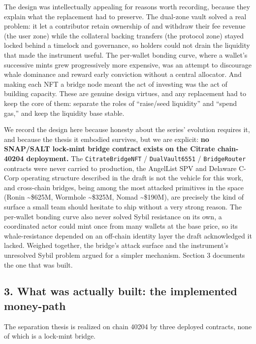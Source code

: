 The design was intellectually appealing for reasons worth recording,
because they explain what the replacement had to preserve. The dual-zone
vault solved a real problem: it let a contributor retain ownership of
and withdraw their fee revenue (the user zone) while the collateral
backing transfers (the protocol zone) stayed locked behind a timelock
and governance, so holders could not drain the liquidity that made the
instrument useful. The per-wallet bonding curve, where a wallet's
successive mints grew progressively more expensive, was an attempt to
discourage whale dominance and reward early conviction without a central
allocator. And making each NFT a bridge node meant the act of investing
was the act of building capacity. These are genuine design virtues, and
any replacement had to keep the core of them: separate the roles of
``raise/seed liquidity'' and ``spend gas,'' and keep the liquidity base
stable.

We record the design here because honesty about the series' evolution
requires it, and because the thesis it embodied survives, but we are
explicit: \textbf{no SNAP/SALT lock-mint bridge contract exists on the
Citrate chain-40204 deployment.} The \texttt{CitrateBridgeNFT} /
\texttt{DualVault6551} / \texttt{BridgeRouter} contracts were never
carried to production, the AngelList SPV and Delaware C-Corp operating
structure described in the draft is not the vehicle for this work, and
cross-chain bridges, being among the most attacked primitives in the
space (Ronin \textasciitilde\$625M, Wormhole \textasciitilde\$325M,
Nomad \textasciitilde\$190M), are precisely the kind of surface a small
team should hesitate to ship without a very strong reason. The
per-wallet bonding curve also never solved Sybil resistance on its own,
a coordinated actor could mint once from many wallets at the base price,
so its whale-resistance depended on an off-chain identity layer the
draft acknowledged it lacked. Weighed together, the bridge's attack
surface and the instrument's unresolved Sybil problem argued for a
simpler mechanism. Section 3 documents the one that was built.

\subsection{3. What was actually built: the implemented
money-path}\label{what-was-actually-built-the-implemented-money-path}

The separation thesis is realized on chain 40204 by three deployed
contracts, none of which is a lock-mint bridge.


